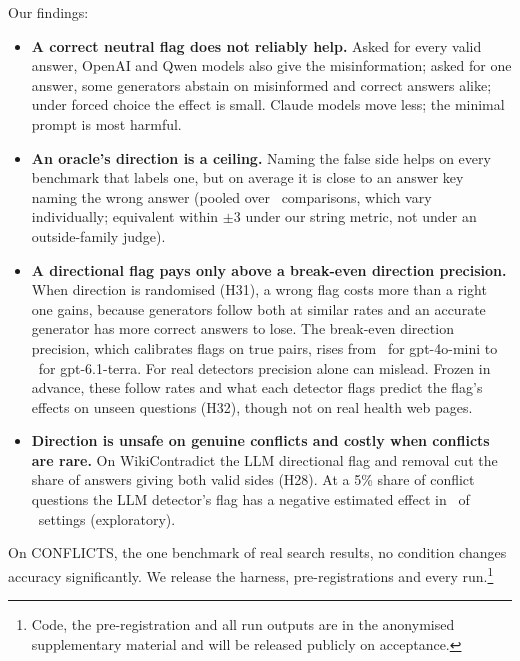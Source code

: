 Our findings:
\begin{itemize}[leftmargin=*,itemsep=1pt,topsep=2pt]
\item \textbf{A correct neutral flag does not reliably help.} Asked for every valid answer, OpenAI and Qwen models also give the
misinformation; asked for one answer, some generators abstain on misinformed and correct answers
alike; under forced choice the effect is small. Claude models move less; the minimal prompt is most harmful.
\item \textbf{An oracle's direction is a ceiling.} Naming the false side helps on every benchmark that labels one, but
on average it is close to an answer key naming the wrong answer (pooled over \PoolTwentyThreeK\
comparisons, which vary individually; equivalent within $\pm$3 under our string metric, not under an outside-family judge).
\item \textbf{A directional flag pays only above a break-even direction precision.} When direction is randomised (H31), a wrong
flag costs more than a right one gains, because generators follow both at similar rates and an accurate generator has
more correct answers to lose. The break-even direction precision, which calibrates flags on true pairs, rises from \beMin\ for gpt-4o-mini to
\beMax\ for gpt-6.1-terra. For real detectors precision alone can mislead. Frozen in advance, these follow rates and
what each detector flags predict the flag's effects on unseen questions (H32), though not on real health
web pages.
\item \textbf{Direction is unsafe on genuine conflicts and costly when conflicts are rare.} On WikiContradict the LLM
directional flag and removal cut the share of answers giving both valid sides (H28). At a 5\% share of conflict
questions the LLM detector's flag has a negative estimated effect in \prevNegFive\ of \prevN\ settings (exploratory).
\end{itemize}
On CONFLICTS, the one benchmark of real search results, no condition changes accuracy significantly. We release the harness, pre-registrations and every run.\footnote{Code, the pre-registration and
all run outputs are in the anonymised supplementary material and will be released publicly on acceptance.}
